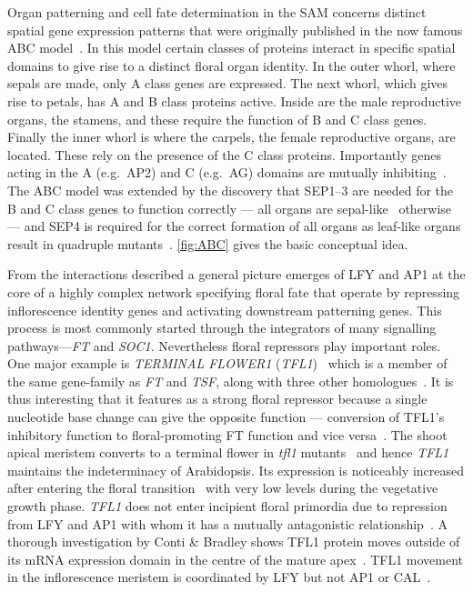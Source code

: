 Organ patterning and cell fate determination in the SAM concerns distinct spatial gene expression patterns that were originally published in the now famous ABC model~\cite{bowman1991,coen1991}.
In this model certain classes of proteins interact in specific spatial domains to give rise to a distinct floral organ identity.
In the outer whorl, where sepals are made, only A class genes are expressed.
The next whorl, which gives rise to petals, has A and B class proteins active.
Inside are the male reproductive organs, the stamens, and these require the function of B and C class genes.
Finally the inner whorl is where the carpels, the female reproductive organs, are located.
These rely on the presence of the C class proteins.
Importantly genes acting in the A (e.g.\ AP2) and C (e.g.\ AG) domains are mutually inhibiting~\cite{drews1991,dinh2012}.
The ABC model was extended by the discovery that SEP1--3 are needed for the B and C class genes to function correctly --- all organs are sepal-like~\cite{pelaz2000} otherwise --- and SEP4 is required for the correct formation of all organs as leaf-like organs result in quadruple mutants~\cite{ditta2004}.
\autoref{fig:ABC} gives the basic conceptual idea. 

From the interactions described a general picture emerges of LFY and AP1 at the core of a highly complex network specifying floral fate that operate by repressing inflorescence identity genes and activating downstream patterning genes.
This process is most commonly started through the integrators of many signalling pathways---\emph{FT} and \emph{SOC1}.
Nevertheless floral repressors play important roles.
One major example is \emph{TERMINAL FLOWER1} (\emph{TFL1})~\cite{shannon1991} which is a member of the same gene-family as \emph{FT} and \emph{TSF}, along with three other homologues~\cite{kobayashi1999}.
It is thus interesting that it features as a strong floral repressor because a single nucleotide base change can give the opposite function --- conversion of TFL1's inhibitory function to floral-promoting FT function and vice versa~\cite{hanzawa2005}.
The shoot apical meristem converts to a terminal flower in \emph{tfl1} mutants~\cite{shannon1991} and hence \emph{TFL1} maintains the indeterminacy of Arabidopsis. 
Its expression is noticeably increased after entering the floral transition~\cite{bradley1997} with very low levels during the vegetative growth phase.
\emph{TFL1} does not enter incipient floral primordia due to repression from LFY and AP1 with whom it has a mutually antagonistic relationship~\cite{ratcliffe1998,ratcliffe1999,winter2011}.
A thorough investigation by Conti \& Bradley shows TFL1 protein moves outside of its mRNA expression domain in the centre of the mature apex~\cite{conti2007}.
TFL1 movement in the inflorescence meristem is coordinated by LFY but not AP1 or CAL~\cite{conti2007}.


